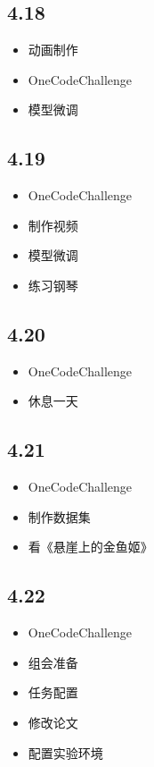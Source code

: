 \documentclass[UTF8]{ctexart}
\begin{document}
\subsection*{4.18}
\begin{itemize}
    \item 动画制作
    \item OneCodeChallenge
    \item 模型微调
\end{itemize}

\subsection*{4.19}
\begin{itemize}
    \item OneCodeChallenge
    \item 制作视频
    \item 模型微调
    \item 练习钢琴
\end{itemize}

\subsection*{4.20}
\begin{itemize}
    \item OneCodeChallenge
    \item 休息一天
\end{itemize}

\subsection*{4.21}
\begin{itemize}
    \item OneCodeChallenge
    \item 制作数据集
    \item 看《悬崖上的金鱼姬》
\end{itemize}

\subsection*{4.22}
\begin{itemize}
    \item OneCodeChallenge
    \item 组会准备
    \item 任务配置
    \item 修改论文
    \item 配置实验环境
\end{itemize}
\end{document}
